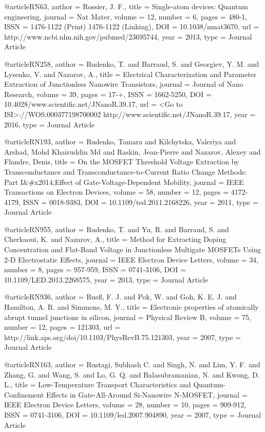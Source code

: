 @article{RN63,
   author = {Rossier, J. F.},
   title = {Single-atom devices: Quantum engineering},
   journal = {Nat Mater},
   volume = {12},
   number = {6},
   pages = {480-1},
   ISSN = {1476-1122 (Print)
1476-1122 (Linking)},
   DOI = {10.1038/nmat3670},
   url = {http://www.ncbi.nlm.nih.gov/pubmed/23695744},
   year = {2013},
   type = {Journal Article}
}

@article{RN258,
   author = {Rudenko, T. and Barraud, S. and Georgiev, Y. M. and Lysenko, V. and Nazarov, A.},
   title = {Electrical Characterization and Parameter Extraction of Junctionless Nanowire Transistors},
   journal = {Journal of Nano Research},
   volume = {39},
   pages = {17-+},
   ISSN = {1662-5250},
   DOI = {10.4028/www.scientific.net/JNanoR.39.17},
   url = {<Go to ISI>://WOS:000377198700002
http://www.scientific.net/JNanoR.39.17},
   year = {2016},
   type = {Journal Article}
}

@article{RN193,
   author = {Rudenko, Tamara and Kilchytska, Valeriya and Arshad, Mohd Khairuddin Md and Raskin, Jean-Pierre and Nazarov, Alexey and Flandre, Denis},
   title = {On the MOSFET Threshold Voltage Extraction by Transconductance and Transconductance-to-Current Ratio Change Methods: Part I&#x2014;Effect of Gate-Voltage-Dependent Mobility},
   journal = {IEEE Transactions on Electron Devices},
   volume = {58},
   number = {12},
   pages = {4172-4179},
   ISSN = {0018-9383},
   DOI = {10.1109/ted.2011.2168226},
   year = {2011},
   type = {Journal Article}
}

@article{RN955,
   author = {Rudenko, T. and Yu, R. and Barraud, S. and Cherkaoui, K. and Nazarov, A.},
   title = {Method for Extracting Doping Concentration and Flat-Band Voltage in Junctionless Multigate MOSFETs Using 2-D Electrostatic Effects},
   journal = {IEEE Electron Device Letters},
   volume = {34},
   number = {8},
   pages = {957-959},
   ISSN = {0741-3106},
   DOI = {10.1109/LED.2013.2268575},
   year = {2013},
   type = {Journal Article}
}

@article{RN936,
   author = {Rueß, F. J. and Pok, W. and Goh, K. E. J. and Hamilton, A. R. and Simmons, M. Y.},
   title = {Electronic properties of atomically abrupt tunnel junctions in silicon},
   journal = {Physical Review B},
   volume = {75},
   number = {12},
   pages = {121303},
   url = {http://link.aps.org/doi/10.1103/PhysRevB.75.121303},
   year = {2007},
   type = {Journal Article}
}

@article{RN163,
   author = {Rustagi, Subhash C. and Singh, N. and Lim, Y. F. and Zhang, G. and Wang, S. and Lo, G. Q. and Balasubramanian, N. and Kwong, D. L.},
   title = {Low-Temperature Transport Characteristics and Quantum-Confinement Effects in Gate-All-Around Si-Nanowire N-MOSFET},
   journal = {IEEE Electron Device Letters},
   volume = {28},
   number = {10},
   pages = {909-912},
   ISSN = {0741-3106},
   DOI = {10.1109/led.2007.904890},
   year = {2007},
   type = {Journal Article}
}


